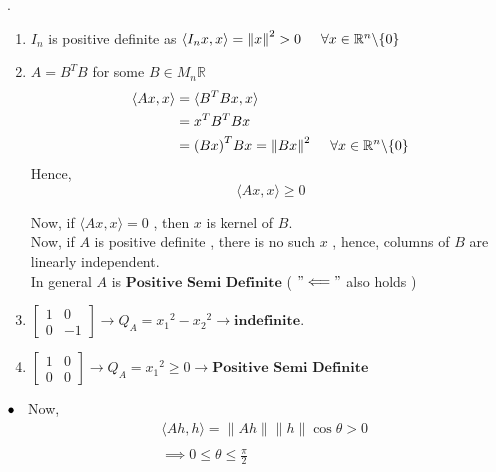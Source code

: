 \documentclass[Analysis-3]{subfiles}
\begin{document}
\begin{Eg}{}
    . \begin{enumerate}
        \item  $I_n$ is positive definite as $\langle I_nx, x \rangle = {\|x \|}^2 > 0 \hspace{5mm} \forall x \in \mathbb{R}^n \backslash \{0\}$ 
        \item $A = B^TB$ for some $B \in M_n{\mathbb{R}}$
         \begin{align*}
            \langle Ax,x \rangle & = \langle B^TBx,x \rangle \\
            &= x^TB^TBx \\
            &= {(Bx)}^T Bx = {\| Bx \|}^2 \hspace{5mm} \forall x \in \mathbb{R}^n \backslash \{0\} 
         \end{align*}   
         Hence, \[ \langle Ax,x \rangle \geq 0 \]

         Now, if $ \langle Ax,x \rangle = 0 $ , then  $x$ is kernel of $B$. \\
         Now, if $A$ is positive definite , there is no such $x$ , hence, columns of $B$ are linearly independent. \\

         In general $A$ is $\textbf{Positive Semi Definite}$
         ( $"\Longleftarrow"$ also holds )

         \item $\begin{bmatrix}
            1 & 0 \\
            0 & -1
         \end{bmatrix} \longrightarrow Q_A = {x_1}^2 - {x_2}^2 \longrightarrow \textbf{indefinite}$.
         \item  $\begin{bmatrix}
            1 & 0 \\
            0 & 0
         \end{bmatrix} \longrightarrow Q_A = {x_1}^2 \geq 0 \longrightarrow \textbf{Positive Semi Definite}$ 

    \end{enumerate}
\end{Eg}

$\bullet \hspace{2mm}$ Now, 
\begin{align*} & \langle Ah, h \rangle = \| Ah\| \| h \| \cos \theta > 0 \\\\
   & \implies \boxed{0 \leq \theta \leq \frac{\pi}{2}}
\end{align*}  
\end{document}

